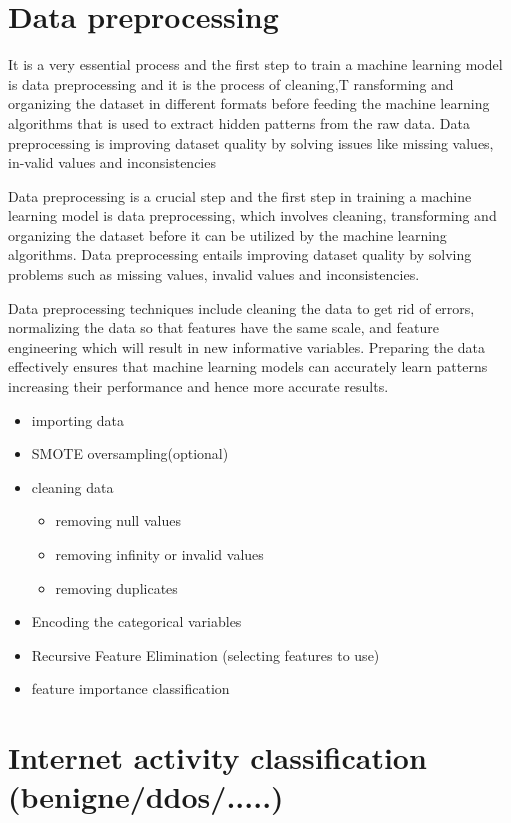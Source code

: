 \section{Data preprocessing}


It is a very essential process and the first step to train a machine learning model is data preprocessing and it is the process of cleaning,T ransforming and organizing the dataset in different formats before feeding the machine learning algorithms that is used to extract hidden patterns from the raw data. Data preprocessing is improving dataset quality by solving issues like missing values, in-valid values and inconsistencies


Data preprocessing is a crucial step and the first step in training a machine learning model is data preprocessing, which involves cleaning, transforming and organizing the dataset before it can be utilized by the machine learning algorithms. Data preprocessing entails improving dataset quality by solving problems such as missing values, invalid values and inconsistencies.


Data preprocessing techniques include cleaning the data to get rid of errors, normalizing the data so that features have the same scale, and feature engineering which will result in new informative variables. Preparing the data effectively ensures that machine learning models can accurately learn patterns increasing their performance and hence more accurate results.



\begin{itemize}
	\item importing data
	\item SMOTE oversampling(optional)
	\item cleaning data
		\begin{itemize}
			\item removing null values
			\item removing infinity or invalid values
			\item removing duplicates
		\end{itemize}
	\item Encoding the categorical variables
	\item Recursive Feature Elimination (selecting features to use)
	\item feature importance classification
\end{itemize}



\section{Internet activity classification (benigne/ddos/.....)}

